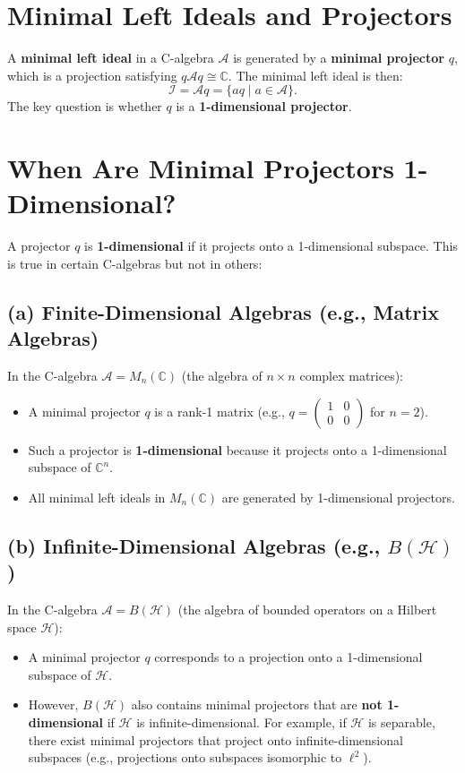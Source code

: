 \documentclass{article}
\begin{document}
\section*{Minimal Left Ideals and Projectors}

A \textbf{minimal left ideal} in a C\*-algebra \( \mathcal{A} \) is generated by a \textbf{minimal projector} \( q \), which is a projection satisfying \( q \mathcal{A} q \cong \mathbb{C} \). The minimal left ideal is then:
\[
\mathcal{I} = \mathcal{A} q = \{ a q \mid a \in \mathcal{A} \}.
\]
The key question is whether \( q \) is a \textbf{1-dimensional projector}.

\section*{When Are Minimal Projectors 1-Dimensional?}

A projector \( q \) is \textbf{1-dimensional} if it projects onto a 1-dimensional subspace. This is true in certain C\*-algebras but not in others:

\subsection*{(a) Finite-Dimensional Algebras (e.g., Matrix Algebras)}

In the C\*-algebra \( \mathcal{A} = M_n(\mathbb{C}) \) (the algebra of \( n \times n \) complex matrices):
\begin{itemize}
    \item A minimal projector \( q \) is a rank-1 matrix (e.g., \( q = \begin{pmatrix} 1 & 0 \\ 0 & 0 \end{pmatrix} \) for \( n = 2 \)).
    \item Such a projector is \textbf{1-dimensional} because it projects onto a 1-dimensional subspace of \( \mathbb{C}^n \).
    \item All minimal left ideals in \( M_n(\mathbb{C}) \) are generated by 1-dimensional projectors.
\end{itemize}

\subsection*{(b) Infinite-Dimensional Algebras (e.g., \( B(\mathcal{H}) \))}

In the C\*-algebra \( \mathcal{A} = B(\mathcal{H}) \) (the algebra of bounded operators on a Hilbert space \( \mathcal{H} \)):
\begin{itemize}
    \item A minimal projector \( q \) corresponds to a projection onto a 1-dimensional subspace of \( \mathcal{H} \).
    \item However, \( B(\mathcal{H}) \) also contains minimal projectors that are \textbf{not 1-dimensional} if \( \mathcal{H} \) is infinite-dimensional. For example, if \( \mathcal{H} \) is separable, there exist minimal projectors that project onto infinite-dimensional subspaces (e.g., projections onto subspaces isomorphic to \( \ell^2 \)).
\end{itemize}
\end{document}
